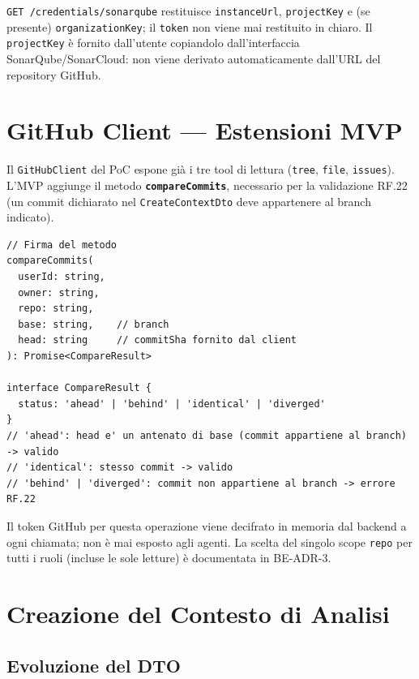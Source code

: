 \documentclass[11pt,a4paper]{article}
\begin{document}
\texttt{GET /credentials/sonarqube} restituisce \texttt{instanceUrl}, \texttt{projectKey} e (se presente) \texttt{organizationKey}; il \texttt{token} non viene mai restituito in chiaro. Il \texttt{projectKey} è fornito dall'utente copiandolo dall'interfaccia SonarQube/SonarCloud: non viene derivato automaticamente dall'URL del repository GitHub.

\section{GitHub Client --- Estensioni MVP}
\label{sec:be-github-mvp}

Il \texttt{GitHubClient} del PoC espone già i tre tool di lettura (\texttt{tree}, \texttt{file}, \texttt{issues}). L'MVP aggiunge il metodo \textbf{\texttt{compareCommits}}, necessario per la validazione RF.22 (un commit dichiarato nel \texttt{CreateContextDto} deve appartenere al branch indicato).

\begin{lstlisting}[caption={\texttt{compareCommits} non è un tool LangGraph ma un metodo interno del \texttt{GitHubClient}, usato dal backend durante la validazione di \texttt{POST /contexts}.}]
// Firma del metodo
compareCommits(
  userId: string,
  owner: string,
  repo: string,
  base: string,    // branch
  head: string     // commitSha fornito dal client
): Promise<CompareResult>

interface CompareResult {
  status: 'ahead' | 'behind' | 'identical' | 'diverged'
}
// 'ahead': head e' un antenato di base (commit appartiene al branch) -> valido
// 'identical': stesso commit -> valido
// 'behind' | 'diverged': commit non appartiene al branch -> errore RF.22
\end{lstlisting}

Il token GitHub per questa operazione viene decifrato in memoria dal backend a ogni chiamata; non è mai esposto agli agenti. La scelta del singolo scope \texttt{repo} per tutti i ruoli (incluse le sole letture) è documentata in BE-ADR-3.

\section{Creazione del Contesto di Analisi}
\label{sec:be-contesto}

\subsection{Evoluzione del DTO}
\end{document}
